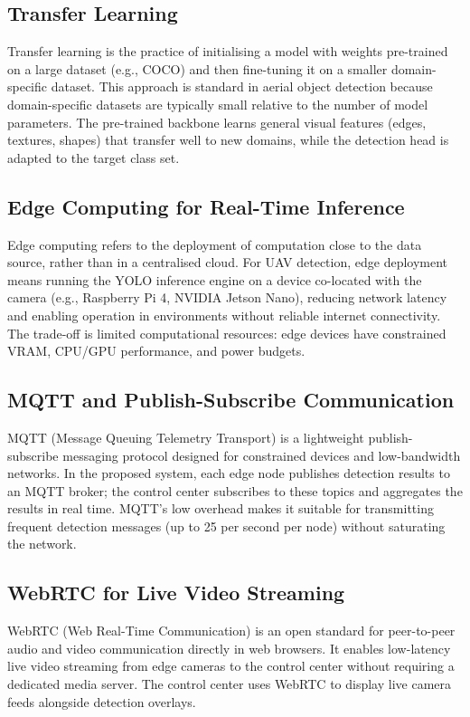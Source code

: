 \documentclass[12pt,a4paper]{report}
\begin{document}
\subsection{Transfer Learning}

Transfer learning is the practice of initialising a model with weights
pre-trained on a large dataset (e.g., COCO) and then fine-tuning it on a
smaller domain-specific dataset. This approach is standard in aerial object
detection because domain-specific datasets are typically small relative to
the number of model parameters. The pre-trained backbone learns general
visual features (edges, textures, shapes) that transfer well to new domains,
while the detection head is adapted to the target class set.

\subsection{Edge Computing for Real-Time Inference}

Edge computing refers to the deployment of computation close to the data
source, rather than in a centralised cloud. For UAV detection, edge
deployment means running the YOLO inference engine on a device co-located
with the camera (e.g., Raspberry Pi 4, NVIDIA Jetson Nano), reducing
network latency and enabling operation in environments without reliable
internet connectivity. The trade-off is limited computational resources:
edge devices have constrained VRAM, CPU/GPU performance, and power budgets.

\subsection{MQTT and Publish-Subscribe Communication}

MQTT (Message Queuing Telemetry Transport) is a lightweight publish-subscribe
messaging protocol designed for constrained devices and low-bandwidth networks.
In the proposed system, each edge node publishes detection results to an MQTT
broker; the control center subscribes to these topics and aggregates the
results in real time. MQTT's low overhead makes it suitable for transmitting
frequent detection messages (up to 25 per second per node) without saturating
the network.

\subsection{WebRTC for Live Video Streaming}

WebRTC (Web Real-Time Communication) is an open standard for peer-to-peer
audio and video communication directly in web browsers. It enables low-latency
live video streaming from edge cameras to the control center without requiring
a dedicated media server. The control center uses WebRTC to display live
camera feeds alongside detection overlays.
\end{document}
